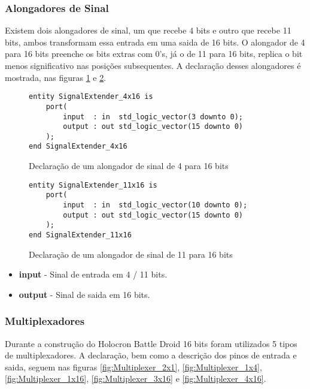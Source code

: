 \documentclass{article}
\newcommand\tab[1][0.50cm]{\hspace*{#1}}
\begin{document}
			\subsubsection{Alongadores de Sinal}
				\tab Existem dois alongadores de sinal, um que recebe 4 bits e outro que recebe 11 bits, ambos transformam essa entrada em uma saida de 16 bits. O alongador de 4 para 16 bits preenche os bits extras com 0's, j\'{a} o de 11 para 16 bits, replica o bit menos significativo nas posi\c{c}\~{o}es subsequentes. A declara\c{c}\~{a}o desses alongadores \'{e} mostrada, nas figuras \ref{fig:SignalExtender_4x16} e \ref{fig:SignalExtender_11x16}.
				\begin{figure}[H]
					\centering
					\caption[Alongador de sinal de 4 para 16 bits]{Declara\c{c}\~{a}o de um alongador de sinal de 4 para 16 bits}
					\label{fig:SignalExtender_4x16}
					\begin{lstlisting}[style=vhdl]
entity SignalExtender_4x16 is
	port(
		input  : in  std_logic_vector(3 downto 0);
		output : out std_logic_vector(15 downto 0)
	);
end SignalExtender_4x16
					\end{lstlisting}
				\end{figure}
				\begin{figure}[H]
				\centering
				\caption[Alongador de sinal de 11 para 16 bits]{Declara\c{c}\~{a}o de um alongador de sinal de 11 para 16 bits}
				\label{fig:SignalExtender_11x16}
					\begin{lstlisting}[style=vhdl]
entity SignalExtender_11x16 is
	port(
		input  : in  std_logic_vector(10 downto 0);
		output : out std_logic_vector(15 downto 0)
	);
end SignalExtender_11x16
					\end{lstlisting}
				\end{figure}
				\begin{itemize}
					\item \textbf{input} - Sinal de entrada em 4 / 11 bits.
					\item \textbf{output} - Sinal de saida em 16 bits.
				\end{itemize}
			\subsubsection{Multiplexadores}
				\tab Durante  a constru\c{c}\~{a}o do Holocron Battle Droid 16 bits foram utilizados 5 tipos de multiplexadores. A declara\c{c}\~{a}o, bem como a descrição dos pinos de entrada e saida, seguem nas figuras \ref{fig:Multiplexer_2x1}, \ref{fig:Multiplexer_1x4}, \ref{fig:Multiplexer_1x16}, \ref{fig:Multiplexer_3x16} e \ref{fig:Multiplexer_4x16}.
				
\end{document}
